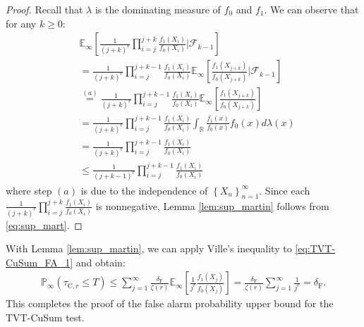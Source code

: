 \documentclass[12pt]{interact}
\newcommand{\lp}{\left(}
\newcommand{\rp}{\right)}
\newcommand{\lb}{\left[}
\newcommand{\rb}{\right]}
\newcommand{\lbp}{\left\{}
\newcommand{\rbp}{\right\}}
\newcommand{\mcal}{\mathcal}
\newcommand{\mrm}{\mathrm}
\newcommand{\mbb}{\mathbb}
\newcommand{\E}{\mathbb{E}}
\renewcommand{\Pr}{\mathbb{P}}
\theoremstyle{plain}
\newcommand{\vvv}[1]{{\color{red}{#1}}}
\begin{document}
\begin{proof}
Recall that $\lambda$ is the dominating measure of $f_{0}$ and $f_{1}$. We can observe that for any $k\geq 0$:
%
\begin{align}\nonumber
&\E_{\infty}\lb\frac{1}{\lp j+k\rp^{r}}\prod_{i=j}^{j+k}\frac{f_{1}\lp X_{i}\rp}{f_{0}\lp X_{i}\rp}\bigg|\mcal{F}_{k-1}\rb\\\nonumber
&=\frac{1}{\lp j+k\rp^{r}}\prod_{i=j}^{j+k-1}\frac{f_{1}\lp X_{i}\rp}{f_{0}\lp X_{i}\rp}\E_{\infty}\lb\frac{f_{1}\lp X_{j+k}\rp}{f_{0}\lp X_{j+k}\rp}\bigg|\mcal{F}_{k-1}\rb\\\nonumber
&\overset{(a)}{=}\frac{1}{\lp j+k\rp^{r}}\prod_{i=j}^{j+k-1}\frac{f_{1}\lp X_{i}\rp}{f_{0}\lp X_{i}\rp}\E_{\infty}\lb\frac{f_{1}\lp X_{j+k}\rp}{f_{0}\lp X_{j+k}\rp}\rb\\\nonumber
&=\frac{1}{\lp j+k\rp^{r}}\prod_{i=j}^{j+k-1}\frac{f_{1}\lp X_{i}\rp}{f_{0}\lp X_{i}\rp}\int_{\mbb{R}}\frac{f_{1}\lp x\rp}{f_{0}\lp x\rp}f_{0}\lp x\rp d\lambda\lp x\rp\\\nonumber
&=\frac{1}{\lp j+k\rp^{r}}\prod_{i=j}^{j+k-1}\frac{f_{1}\lp X_{i}\rp}{f_{0}\lp X_{i}\rp}\\
&\leq\frac{1}{\lp j+k-1\rp^{r}}\prod_{i=j}^{j+k-1}\frac{f_{1}\lp X_{i}\rp}{f_{0}\lp X_{i}\rp}\label{eq:sup_mart}
\end{align}
%
where step $(a)$ is due to the independence of $\lbp X_{n}\rbp_{n=1}^{\infty}$. Since each $\frac{1}{\lp j+k\rp^{r}}\prod_{i=j}^{j+k}\frac{f_{1}\lp X_{i}\rp}{f_{0}\lp X_{i}\rp}$ is nonnegative, Lemma \ref{lem:sup_martin} follows from \eqref{eq:sup_mart}.
\end{proof}

With Lemma \ref{lem:sup_martin}, we can apply Ville's inequality to \eqref{eq:TVT-CuSum_FA_1} and obtain:
%
\begin{equation}\label{eq:TVT-CuSum_FA_2}
\begin{aligned}
\Pr_{\infty}\lp\tau_{\mrm{C},r}\leq T\rp
\leq\sum_{j=1}^{\infty}\frac{\delta_{\mathrm{F}}}{\zeta\lp r\rp}\E_{\infty}\lb\frac{1}{j^{r}}\frac{f_{1}\lp X_{j}\rp}{f_{0}\lp X_{j}\rp}\rb =\frac{\delta_{\mathrm{F}}}{\zeta\lp r\rp}\sum_{j=1}^{\infty}\frac{1}{j^{r}} =\delta_{\mathrm{F}}.
\end{aligned}
\end{equation}
%
This completes the proof of the false alarm probability upper bound for the TVT-CuSum test.
\end{document}
